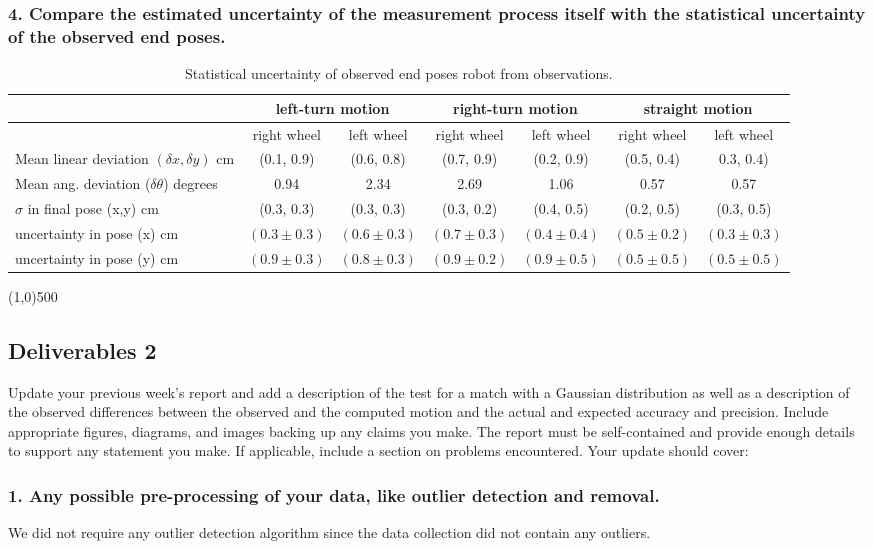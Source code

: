 \documentclass[11pt,a4paper,openright,twoside]{extreport}
\newcommand{\sectionLine}{\begin{center}\line(1,0){500}\end{center}}
\begin{document}
\subsubsection*{4. Compare the estimated uncertainty of the measurement process itself with the statistical uncertainty of the observed end poses.}
\begin{table}[ht]
\centering
\begin{tabular}{| l | c | c | c | c | c | c |}
\hline
 & \multicolumn{2}{c|}{left-turn motion} & \multicolumn{2}{c|}{ right-turn motion} & \multicolumn{2}{c|}{straight motion} \\
\hline
 & right wheel & left wheel & right wheel & left wheel & right wheel & left wheel \\
\hline
Mean linear deviation $(\delta x, \delta y)$ cm & (0.1, 0.9) & (0.6, 0.8)
& (0.7, 0.9) & (0.2, 0.9) & (0.5, 0.4) & 0.3, 0.4) \\
\hline
Mean ang. deviation ($\delta \theta$) degrees & 0.94 & 2.34 & 2.69 & 1.06 & 0.57 & 0.57 \\
\hline
$\sigma$ in final pose (x,y) cm & (0.3, 0.3) & (0.3, 0.3) & (0.3, 0.2) & (0.4, 0.5) & (0.2, 0.5) & (0.3, 0.5)\\
\hline
uncertainty in pose (x) cm & $(0.3 \pm 0.3)$ & $(0.6 \pm 0.3)$ & $(0.7 \pm 0.3)$ & $(0.4 \pm 0.4)$ & $(0.5 \pm 0.2)$ & $(0.3 \pm 0.3)$ \\
uncertainty in pose (y) cm & $(0.9 \pm 0.3)$ & $(0.8 \pm 0.3)$ & $(0.9 \pm 0.2)$ & $(0.9 \pm 0.5)$ & $(0.5 \pm 0.5)$ & $(0.5 \pm 0.5)$ \\
\hline
\end{tabular}
\caption{Statistical uncertainty of observed end poses robot from observations.}
\label{stats}
\end{table}
\sectionLine
\subsection*{Deliverables 2}
Update your previous week’s report and add a description of the test for a match with a Gaussian distribution as well as a description of the observed differences between the observed and the computed motion and the actual and expected accuracy and precision. Include appropriate figures, diagrams, and images backing up any claims you make. The report must be self-contained and provide enough details to support any statement you make. If applicable, include a section on problems encountered. Your update should cover:

\subsubsection*{1. Any possible pre-processing of your data, like outlier detection and removal.}
We did not require any outlier detection algorithm since the data collection did not contain any outliers.
\end{document}
